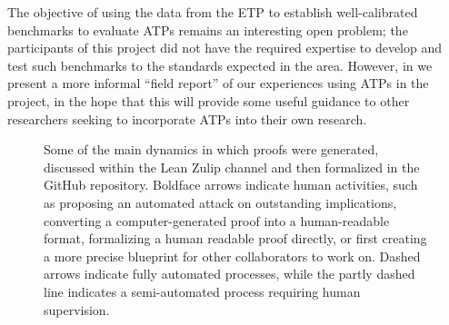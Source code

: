 \documentclass[12pt]{amsart}
\theoremstyle{definition}
\begin{document}
The objective of using the data from the ETP to establish well-calibrated benchmarks to evaluate ATPs remains an interesting open problem; the participants of this project did not have the required expertise to develop and test such benchmarks to the standards expected in the area.  However, in  we present a more informal ``field report'' of our experiences using ATPs in the project, in the hope that this will provide some useful guidance to other researchers seeking to incorporate ATPs into their own research.

\begin{figure}
\centering
{}
\caption{Some of the main dynamics in which proofs were generated, discussed within the Lean Zulip channel and then formalized in the GitHub repository.  Boldface arrows indicate human activities, such as proposing an automated attack on outstanding implications, converting a computer-generated proof into a human-readable format, formalizing a human readable proof directly, or first creating a more precise blueprint for other collaborators to work on.  Dashed arrows indicate fully automated processes, while the partly dashed line indicates a semi-automated process requiring human supervision. }
\label{fig:flow}
\end{figure}
\end{document}
